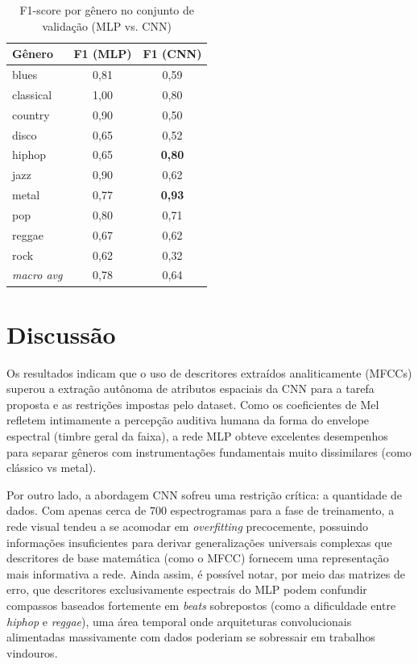 \documentclass[conference]{IEEEtran}
\begin{document}
	\begin{table}[htbp]
		\centering
		\caption{F1-score por gênero no conjunto de validação (MLP vs. CNN)}
		\label{tab:f1_genero}
		\begin{tabular}{lcc}
			\toprule
			\textbf{Gênero} & \textbf{F1 (MLP)} & \textbf{F1 (CNN)} \\
			\midrule
			blues     & 0,81 & 0,59 \\
			classical & 1,00 & 0,80 \\
			country   & 0,90 & 0,50 \\
			disco     & 0,65 & 0,52 \\
			hiphop    & 0,65 & \textbf{0,80} \\
			jazz      & 0,90 & 0,62 \\
			metal     & 0,77 & \textbf{0,93} \\
			pop       & 0,80 & 0,71 \\
			reggae    & 0,67 & 0,62 \\
			rock      & 0,62 & 0,32 \\
			\midrule
			\textit{macro avg} & 0,78 & 0,64 \\
			\bottomrule
		\end{tabular}
	\end{table}
	
	\section{Discussão}
	Os resultados indicam que o uso de descritores extraídos analiticamente (MFCCs) superou a extração autônoma de atributos espaciais da CNN para a tarefa proposta e as restrições impostas pelo dataset. Como os coeficientes de Mel refletem intimamente a percepção auditiva humana da forma do envelope espectral (timbre geral da faixa), a rede MLP obteve excelentes desempenhos para separar gêneros com instrumentações fundamentais muito dissimilares (como clássico vs metal).
	
	Por outro lado, a abordagem CNN sofreu uma restrição crítica: a quantidade de dados. Com apenas cerca de 700 espectrogramas para a fase de treinamento, a rede visual tendeu a se acomodar em \textit{overfitting} precocemente, possuindo informações insuficientes para derivar generalizações universais complexas que descritores de base matemática (como o MFCC) fornecem uma representação mais informativa a rede. Ainda assim, é possível notar, por meio das matrizes de erro, que descritores exclusivamente espectrais do MLP podem confundir compassos baseados fortemente em \textit{beats} sobrepostos (como a dificuldade entre \textit{hiphop} e \textit{reggae}), uma área temporal onde arquiteturas convolucionais alimentadas massivamente com dados poderiam se sobressair em trabalhos vindouros.
	
\end{document}
